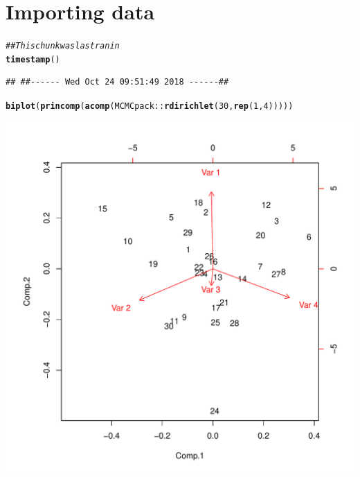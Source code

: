 \documentclass{article}\usepackage[]{graphicx}\usepackage[]{color}
\makeatletter
\def\maxwidth{ %
  \ifdim\Gin@nat@width>\linewidth
    \linewidth
  \else
    \Gin@nat@width
  \fi
}
\newcommand{\hlnum}[1]{\textcolor[rgb]{0.686,0.059,0.569}{#1}}%
\newcommand{\hlcom}[1]{\textcolor[rgb]{0.678,0.584,0.686}{\textit{#1}}}%
\newcommand{\hlopt}[1]{\textcolor[rgb]{0,0,0}{#1}}%
\newcommand{\hlstd}[1]{\textcolor[rgb]{0.345,0.345,0.345}{#1}}%
\newcommand{\hlkwd}[1]{\textcolor[rgb]{0.737,0.353,0.396}{\textbf{#1}}}%
\newenvironment{kframe}{%
 \def\at@end@of@kframe{}%
 \ifinner\ifhmode%
  \def\at@end@of@kframe{\end{minipage}}%
  \begin{minipage}{\columnwidth}%
 \fi\fi%
 \def\FrameCommand##1{\hskip\@totalleftmargin \hskip-\fboxsep
 \colorbox{shadecolor}{##1}\hskip-\fboxsep
     \hskip-\linewidth \hskip-\@totalleftmargin \hskip\columnwidth}%
 \MakeFramed {\advance\hsize-\width
   \@totalleftmargin\z@ \linewidth\hsize
   \@setminipage}}%
 {\par\unskip\endMakeFramed%
 \at@end@of@kframe}
\newenvironment{knitrout}{}{} %
\makeatother
\begin{document}
\section{Importing data}
\begin{knitrout}
\color{fgcolor}\begin{kframe}
\begin{alltt}
\hlcom{## This chunk was last ran in}
\hlkwd{timestamp}\hlstd{()}
\end{alltt}
\begin{verbatim}
## ##------ Wed Oct 24 09:51:49 2018 ------##
\end{verbatim}
\begin{alltt}
\hlkwd{biplot}\hlstd{(}\hlkwd{princomp}\hlstd{(}\hlkwd{acomp}\hlstd{(MCMCpack}\hlopt{::}\hlkwd{rdirichlet}\hlstd{(}\hlnum{30}\hlstd{,} \hlkwd{rep}\hlstd{(}\hlnum{1}\hlstd{,} \hlnum{4}\hlstd{)))))}
\end{alltt}
\end{kframe}
\includegraphics[width=\maxwidth]{figure/unnamed-chunk-6-1} 

\end{knitrout}
\end{document}
